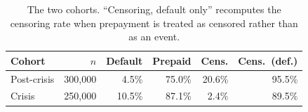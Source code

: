 \begin{table}[t]
\caption{The two cohorts. ``Censoring, default only'' recomputes the censoring rate when prepayment is treated as censored rather than as an event.}
\label{tab:data}
\centering\footnotesize
\begin{tabular}{@{}lrrrrr@{}}
\toprule
Cohort & $n$ & Default & Prepaid & Cens. & Cens.\ (def.) \\
\midrule
Post-crisis & 300,000 & 4.5\% & 75.0\% & 20.6\% & 95.5\% \\
Crisis & 250,000 & 10.5\% & 87.1\% & 2.4\% & 89.5\% \\
\bottomrule
\end{tabular}
\end{table}
